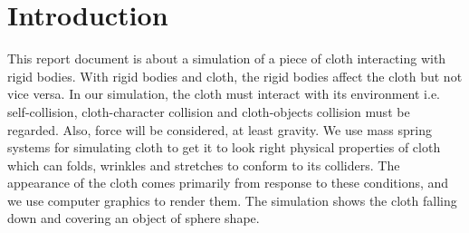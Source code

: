 \section{Introduction}
This report document is about a simulation of a piece of cloth interacting with rigid bodies. With rigid bodies and cloth, the rigid bodies affect the cloth but not vice versa. In our simulation, the cloth must interact with its environment i.e. self-collision, cloth-character collision and cloth-objects collision must be regarded. Also, force will be considered, at least gravity. We use mass spring systems for simulating cloth to get it to look right physical properties of cloth which can folds, wrinkles and stretches to conform to its colliders. The appearance of the cloth comes primarily from response to these conditions, and we use computer graphics to render them. The simulation shows the cloth falling down and covering an object of sphere shape.

